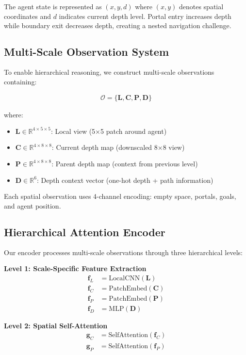 \documentclass[11pt,a4paper]{article}
\begin{document}
The agent state is represented as $(x, y, d)$ where $(x,y)$ denotes spatial coordinates and $d$ indicates current depth level. Portal entry increases depth while boundary exit decreases depth, creating a nested navigation challenge.

\subsection{Multi-Scale Observation System}

To enable hierarchical reasoning, we construct multi-scale observations containing:

\begin{align}
\mathcal{O} = \{\mathbf{L}, \mathbf{C}, \mathbf{P}, \mathbf{D}\}
\end{align}

where:
\begin{itemize}
    \item $\mathbf{L} \in \mathbb{R}^{4 \times 5 \times 5}$: Local view (5×5 patch around agent)
    \item $\mathbf{C} \in \mathbb{R}^{4 \times 8 \times 8}$: Current depth map (downscaled 8×8 view)
    \item $\mathbf{P} \in \mathbb{R}^{4 \times 8 \times 8}$: Parent depth map (context from previous level)
    \item $\mathbf{D} \in \mathbb{R}^{6}$: Depth context vector (one-hot depth + path information)
\end{itemize}

Each spatial observation uses 4-channel encoding: empty space, portals, goals, and agent position.

\subsection{Hierarchical Attention Encoder}

Our encoder processes multi-scale observations through three hierarchical levels:

\textbf{Level 1: Scale-Specific Feature Extraction}
\begin{align}
\mathbf{f}_L &= \text{LocalCNN}(\mathbf{L}) \\
\mathbf{f}_C &= \text{PatchEmbed}(\mathbf{C}) \\
\mathbf{f}_P &= \text{PatchEmbed}(\mathbf{P}) \\
\mathbf{f}_D &= \text{MLP}(\mathbf{D})
\end{align}

\textbf{Level 2: Spatial Self-Attention}
\begin{align}
\mathbf{g}_C &= \text{SelfAttention}(\mathbf{f}_C) \\
\mathbf{g}_P &= \text{SelfAttention}(\mathbf{f}_P)
\end{align}
\end{document}
